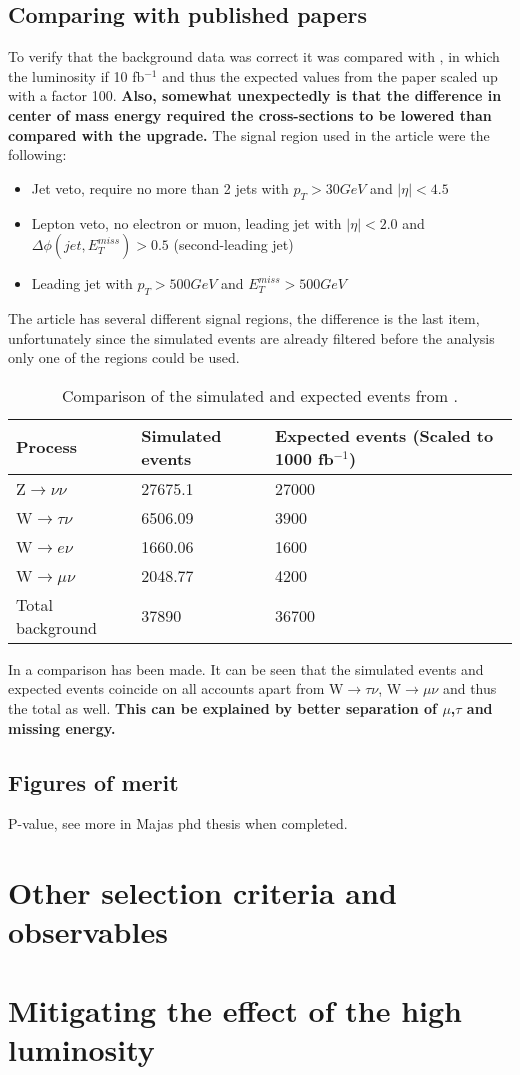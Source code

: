 \subsection{Comparing with published papers} 	
To verify that the background data was correct it was compared with \citep{ATLAS-CONF-2012-147}, in which the luminosity if 10 fb$^{-1}$ and thus the expected values from the paper scaled up with a factor 100. \textbf{Also, somewhat unexpectedly is that the difference in center of mass energy required the cross-sections to be lowered than compared with the upgrade.} The signal region used in the article were the following:
\begin{itemize}
\item Jet veto, require no more than 2 jets with $p_T > 30 GeV$ and $|\eta| < 4.5$
\item Lepton veto, no electron or muon, leading jet with $|\eta| < 2.0$ and $\Delta \phi (jet, E_T^{miss})>0.5$ (second-leading jet)
\item Leading jet with $p_T > 500 GeV$ and $E_T^{miss}>500 GeV$
\end{itemize}
The article has several different signal regions, the difference is the last item, unfortunately since the simulated events are already filtered before the analysis only one of the regions could be used.
\begin{table}[ht]
\begin{center}
\begin{tabular}{|l|l|l|}
\hline
Process & Simulated events & Expected events (Scaled to 1000 fb$^{-1}$) \\ \hline
Z$\rightarrow\nu\nu$&27675.1&27000 \\
W$\rightarrow\tau\nu$&6506.09&3900 \\
W$\rightarrow e\nu$&1660.06&1600 \\
W$\rightarrow\mu\nu$&2048.77&4200 \\ \hline
Total background&37890&36700 \\ \hline
\end{tabular}
\caption{Comparison of the simulated and expected events from \citep{ATLAS-CONF-2012-147}.}
\label{tab:Compare1}
\end{center}
\end{table}

In  a comparison has been made. It can be seen that the simulated events and expected events coincide on all accounts apart from W$\rightarrow\tau\nu$, W$\rightarrow\mu\nu$ and thus the total as well. \textbf{This can be explained by better separation of $\mu$,$\tau$ and missing energy.} 

\subsection{Figures of merit}
P-value, see more in Majas phd thesis when completed.
\section{Other selection criteria and observables}
\section{Mitigating the effect of the high luminosity}